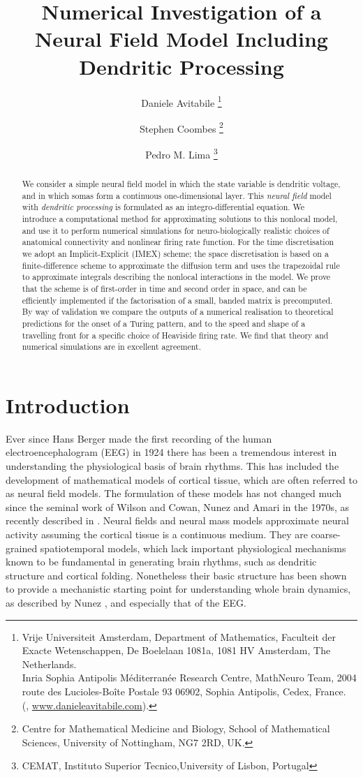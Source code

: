 \documentclass[a4paper,final]{siamart190516}
\title{Numerical Investigation of a Neural Field Model Including Dendritic Processing}
\author{%
  Daniele Avitabile%
  \thanks{%
    Vrije Universiteit Amsterdam,
    Department of Mathematics,
    Faculteit der Exacte Wetenschappen,
    De Boelelaan 1081a,
    1081 HV Amsterdam, The Netherlands.
  \protect\\
    Inria Sophia Antipolis M\'editerran\'ee Research Centre,
    MathNeuro Team,
    2004 route des Lucioles-Boîte Postale 93 06902,
    Sophia Antipolis, Cedex, France.
  \protect\\
    (\email{d.avitabile@vu.nl}, \url{www.danieleavitabile.com}).
  }
  \and
  Stephen Coombes \thanks{Centre for Mathematical Medicine and Biology, School of
  Mathematical Sciences, University of Nottingham, NG7 2RD, UK.}
  \and
  Pedro M. Lima \thanks{CEMAT, Instituto Superior Tecnico,University of Lisbon,
  Portugal}
}
\begin{document}
\maketitle

\begin{abstract}
We consider a simple neural field model in which the state variable is dendritic
voltage, and in which somas form a continuous one-dimensional layer.
This \textit{neural field} model with \textit{dendritic processing} is formulated as
an integro-differential equation. We introduce a
computational method for approximating solutions to this nonlocal model, and use
it to perform numerical simulations for neuro-biologically realistic choices of
anatomical connectivity and nonlinear firing rate function.  For the time
discretisation we adopt an Implicit-Explicit (IMEX) scheme; the space discretisation
is based on a finite-difference scheme to approximate the diffusion term and uses the
trapezoidal rule to approximate integrals describing the nonlocal interactions in
the model. We prove that the scheme is of first-order in time and second order in
space, and can be efficiently implemented if the factorisation of a small, banded
matrix is precomputed. By way of validation we compare the outputs of a numerical
realisation to theoretical predictions for the onset of a Turing pattern, and to the
speed and shape of a travelling front for a specific choice of Heaviside firing rate.
We find that theory and numerical simulations are in excellent agreement.

\end{abstract}

\section{Introduction}

Ever since Hans Berger made the first recording of the human electroencephalogram
(EEG) in 1924 there has been a tremendous interest in understanding the physiological
basis of brain rhythms. This has included the development of mathematical models of
cortical tissue, which are often referred to as neural field models.  
The formulation of these models has not changed much since the seminal work of Wilson
and Cowan, Nunez and Amari in the 1970s, as recently described in \cite{Coombes2014}.
Neural fields and neural mass models approximate neural activity assuming the
cortical tissue is a continuous medium. They are coarse-grained spatiotemporal models,
which lack important physiological mechanisms known to be fundamental in generating brain
rhythms, such as dendritic structure and cortical folding. Nonetheless their basic
structure has been shown to provide a mechanistic starting point for understanding
whole brain dynamics, as described by Nunez \cite{Nunez1995}, and especially that of
the EEG.
\end{document}
